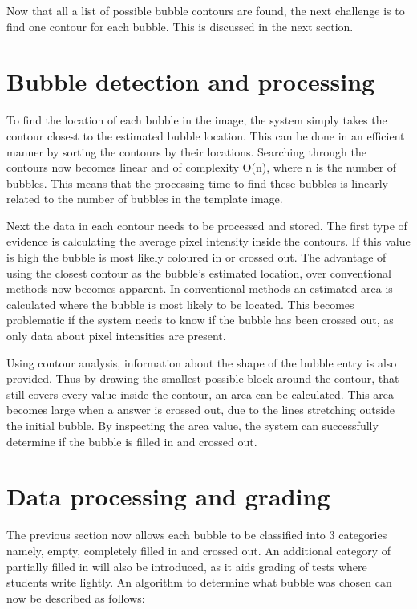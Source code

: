 Now that all a list of possible bubble contours are found, the next challenge is to find one contour for each bubble. This is discussed in the next section.

\section{Bubble detection and processing}

To find the location of each bubble in the image, the system simply takes the contour closest to the estimated bubble location. This can be done in an efficient manner by sorting the contours by their locations. Searching through the contours now becomes linear and of complexity O(n), where n is the number of bubbles. This means that the processing time to find these bubbles is linearly related to the number of bubbles in the template image. 

Next the data in each contour needs to be processed and stored. The first type of evidence is calculating the average pixel intensity inside the contours. If this value is high the bubble is most likely coloured in or crossed out. The advantage of using the closest contour as the bubble's estimated location, over conventional methods now becomes apparent. In conventional methods an estimated area is calculated where the bubble is most likely to be located. This becomes problematic if the system needs to know if the bubble has been crossed out, as only data about pixel intensities are present. 

Using contour analysis, information about the shape of the bubble entry is also provided. Thus by drawing the smallest possible block around the contour, that still covers every value inside the contour, an area can be calculated. This area becomes large when a answer is crossed out, due to the lines stretching outside the initial bubble. By inspecting the area value, the system can successfully determine if the bubble is filled in and crossed out.

\section{Data processing and grading}

The previous section now allows each bubble to be classified into 3 categories namely, empty, completely filled in and crossed out. An additional category of partially filled in will also be introduced, as it aids grading of tests where students write lightly. An algorithm to determine what bubble was chosen can now be described as follows:

